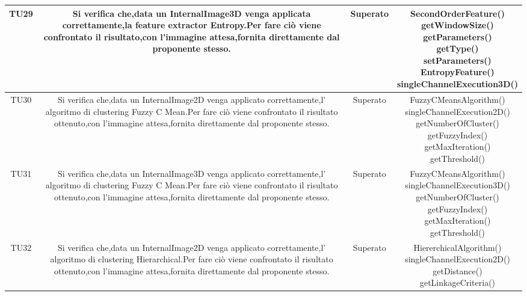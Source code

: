 \begin{center}
\begin{longtable}{|c|c|c|c|}
\hline
TU29 & \parbox[t]{\larghezza}{ Si verifica che,data un InternalImage3D venga applicata correttamente,la feature extractor Entropy.Per fare ciò viene confrontato il risultato,con l'immagine attesa,fornita direttamente dal proponente stesso. } & Superato & \parbox[t]{\dimTipo} { SecondOrderFeature() \\ getWindowSize() \\ getParameters() \\ getType() \\ setParameters() \\ EntropyFeature() \\ singleChannelExecution3D() \\ } \\
\hline
TU30 & \parbox[t]{\larghezza}{ Si verifica che,data un InternalImage2D venga applicato correttamente,l' algoritmo di clustering Fuzzy C Mean.Per fare ciò viene confrontato il risultato ottenuto,con l'immagine attesa,fornita direttamente dal proponente stesso. } & Superato & \parbox[t]{\dimTipo} { FuzzyCMeansAlgorithm() \\ singleChannelExecution2D() \\ getNumberOfCluster() \\ getFuzzyIndex() \\ getMaxIteration() \\ getThreshold() \\ } \\
\hline
TU31 & \parbox[t]{\larghezza}{ Si verifica che,data un InternalImage3D venga applicato correttamente,l' algoritmo di clustering Fuzzy C Mean.Per fare ciò viene confrontato il risultato ottenuto,con l'immagine attesa,fornita direttamente dal proponente stesso. } & Superato & \parbox[t]{\dimTipo} { FuzzyCMeansAlgorithm() \\ singleChannelExecution3D() \\ getNumberOfCluster() \\ getFuzzyIndex() \\ getMaxIteration() \\ getThreshold() \\ } \\
\hline
TU32 & \parbox[t]{\larghezza}{ Si verifica che,data un InternalImage2D venga applicato correttamente,l' algoritmo di clustering Hierarchical.Per fare ciò viene confrontato il risultato ottenuto,con l'immagine attesa,fornita direttamente dal proponente stesso. } & Superato & \parbox[t]{\dimTipo} { HiererchicalAlgorithm() \\ singleChannelExecution2D() \\ getDistance() \\ getLinkageCriteria() \\ } \\

\end{longtable}
\end{center}
